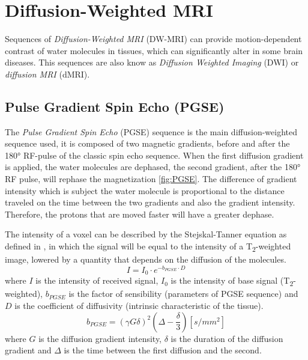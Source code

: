 \section{Diffusion-Weighted MRI}
 Sequences of \emph{Diffusion-Weighted MRI} (DW-MRI) can provide motion-dependent contrast of water molecules in tissues, which can significantly alter in some brain diseases. This sequences are also know as \emph{Diffusion Weighted Imaging} (DWI) or \emph{diffusion MRI} (dMRI). 
 \subsection{Pulse Gradient Spin Echo (PGSE)}
 The \emph{Pulse Gradient Spin Echo} (PGSE) sequence is the main diffusion-weighted sequence used, it is composed of two magnetic gradients, before and after the 180° RF-pulse of the classic spin echo sequence. When the first diffusion gradient is applied, the water molecules are dephased, the second gradient, after the 180° RF pulse, will rephase the magnetization \ref{fig:PGSE}. The difference of gradient intensity which is subject the water molecule is proportional to the distance traveled on the time between the two gradients and also the gradient intensity. Therefore, the protons that are moved faster will have a greater dephase.\cite{elementiRisonanza}

 The intensity of a voxel can be described by the Stejskal-Tanner equation as defined in \cite{dtiBook}, in which the signal will be equal to the intensity of a T\textsubscript{2}-weighted image, lowered by a quantity that depends on the diffusion of the molecules.
 \begin{equation}
    I = I_0 \cdot e^{-b_{PGSE} \cdot D}
 \end{equation}
 where $I$ is the intensity of received signal, $I_0$ is the intensity of base signal (T\textsubscript{2}-weighted), $b_{PGSE}$ is the factor of sensibility (parameters of PGSE sequence) and $D$ is the coefficient of diffusivity (intrinsic characteristic of the tissue).
 \begin{equation}
    b_{PGSE} = (\gamma G \delta)^{2}(\Delta - \frac{\delta}{3}) [s/mm^2]
 \end{equation}
 where $G$ is the diffusion gradient intensity, $\delta$ is the duration of the diffusion gradient and $\Delta$ is the time between the first diffusion and the second.


